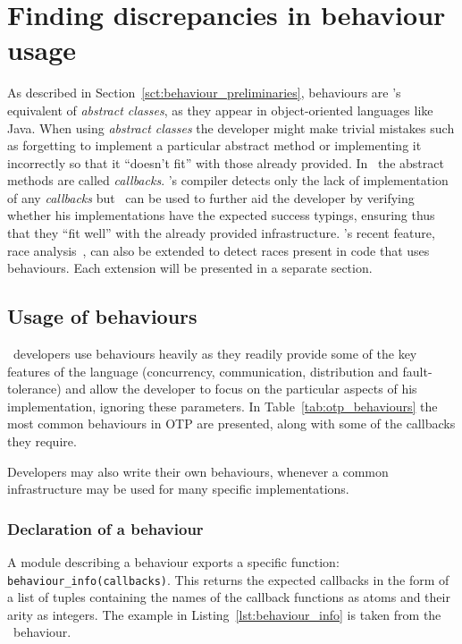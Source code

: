 \chapter{Finding discrepancies in behaviour usage}
\label{chp:behaviours}

As described in Section~\ref{sct:behaviour_preliminaries}, behaviours
are \er's equivalent of \emph{abstract classes}, as they appear in
object-oriented languages like Java. When using \emph{abstract
  classes} the developer might make trivial mistakes such as
forgetting to implement a particular abstract method or implementing
it incorrectly so that it ``doesn't fit'' with those already
provided. In \er\ the abstract methods are called
\emph{callbacks}. \er's compiler detects only the lack of
implementation of any \emph{callbacks} but \dr\ can be used to further
aid the developer by verifying whether his implementations have the
expected success typings, ensuring thus that they ``fit well'' with
the already provided infrastructure. \dr's recent feature, race
analysis~\cite{Races@PADL-10}, can also be extended to detect races
present in code that uses behaviours. Each extension will be presented
in a separate section.

\section{Usage of behaviours}

\er\ developers use behaviours heavily as they readily provide some of
the key features of the language (concurrency, communication,
distribution and fault-tolerance) and allow the developer to focus on
the particular aspects of his implementation, ignoring these
parameters. In Table~\ref{tab:otp_behaviours} the most common
behaviours in OTP are presented, along with some of the callbacks they
require.



Developers may also write their own behaviours, whenever a common
infrastructure may be used for many specific implementations.

\subsection{Declaration of a behaviour}

A module describing a behaviour exports a specific function:
\texttt{behaviour\_info(callbacks)}. This returns the expected
callbacks in the form of a list of tuples containing the names of the
callback functions as atoms and their arity as integers. The example
in Listing~\ref{lst:behaviour_info} is taken from the
\genserv\ behaviour.

